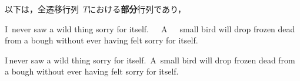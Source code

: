 \documentclass{jsarticle}
\begin{document}
以下は，全遷移行列~$T$における{\bf 部分}行列であり，

I\,\,\,never saw a wild thing sorry for itself.\ \ \ 
A~~~small bird will drop frozen dead from a bough \hspace{15pt}
without ever having felt sorry for itself.

I\,never saw a wild thing sorry for itself.\ 
A~small bird will drop frozen dead from a bough \hspace{1pt}
without ever having felt sorry for itself.
\end{document}
